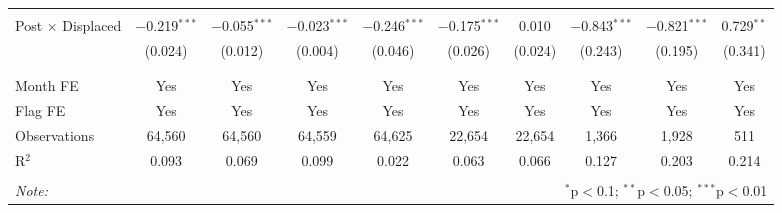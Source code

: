 \documentclass[12pt]{article}
\begin{document}
\begin{landscape}
\begin{table}[H]
\begin{tabular}{@{\extracolsep{1pt}}lccccccccc}
  & & & & & & & & & \\ 
 Post $\times$ Displaced & $-$0.219$^{***}$ & $-$0.055$^{***}$ & $-$0.023$^{***}$ & $-$0.246$^{***}$ & $-$0.175$^{***}$ & 0.010 & $-$0.843$^{***}$ & $-$0.821$^{***}$ & 0.729$^{**}$ \\ 
  & (0.024) & (0.012) & (0.004) & (0.046) & (0.026) & (0.024) & (0.243) & (0.195) & (0.341) \\ 
  & & & & & & & & & \\ 
\hline \\[-1.8ex] 
Month FE & Yes & Yes & Yes & Yes & Yes & Yes & Yes & Yes & Yes \\ 
Flag FE & Yes & Yes & Yes & Yes & Yes & Yes & Yes & Yes & Yes \\ 
Observations & 64,560 & 64,560 & 64,559 & 64,625 & 22,654 & 22,654 & 1,366 & 1,928 & 511 \\ 
R$^{2}$ & 0.093 & 0.069 & 0.099 & 0.022 & 0.063 & 0.066 & 0.127 & 0.203 & 0.214 \\ 
\hline 
\hline \\[-1.8ex] 
\textit{Note:}  & \multicolumn{9}{r}{$^{*}$p$<$0.1; $^{**}$p$<$0.05; $^{***}$p$<$0.01} \\ 
\end{tabular} 
\end{table} 
\end{landscape}
\end{document}
